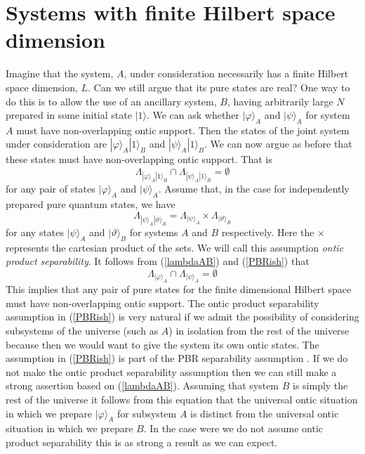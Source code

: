 \documentclass[12pt]{article}
\begin{document}
\section{Systems with finite Hilbert space dimension}\label{finitedimcase}


Imagine that the system, $A$, under consideration necessarily has a finite Hilbert space dimension, $L$.  Can we still argue that its pure states are real?  One way to do this is to allow
the use of an ancillary system, $B$, having arbitrarily large $N$ prepared in some initial state $|1\rangle$.  We can ask whether $|\varphi\rangle_A$ and $|\psi\rangle_A$ for system $A$ must
have non-overlapping ontic support.  Then the states of the joint system under consideration are $|\varphi\rangle_A |1\rangle_B$ and $|\psi\rangle_A|1\rangle_B$.  We can now argue as before
that these states must have non-overlapping ontic support.  That is 
\begin{equation}\label{lambdaAB} \Lambda_{|\varphi\rangle_A |1\rangle_B} \cap \Lambda_{|\psi\rangle_A|1\rangle_B} =
\emptyset \end{equation} 
for any pair of states $|\varphi\rangle_A$ and $|\psi\rangle_A$.  Assume that, in the case for independently prepared pure quantum states, we have
\begin{equation}\label{PBRish} \Lambda_{|\psi\rangle_A|\vartheta\rangle_B} = \Lambda_{|\psi\rangle_A}\times\Lambda_{|\vartheta\rangle_B} \end{equation} 
for any states $|\psi\rangle_A$ and
$|\vartheta\rangle_B$ for systems $A$ and $B$ respectively. Here the $\times$ represents the cartesian product of the sets. We will call this assumption \emph{ontic product separability}.
It follows from (\ref{lambdaAB}) and (\ref{PBRish}) that 
\begin{equation} \Lambda_{|\varphi\rangle_A} \cap \Lambda_{|\psi\rangle_A} = \emptyset \end{equation} 
This implies that any pair of
pure states for the finite dimensional Hilbert space must have non-overlapping ontic support.  The ontic product separability assumption in (\ref{PBRish}) is very natural if we admit the
possibility of considering subsystems of the universe (such as $A$) in isolation from the rest of the universe because then we would want to give the system its own ontic states.   The assumption in (\ref{PBRish}) is part of the PBR separability assumption
\cite{pusey2011quantum}.  If we do not make the ontic product separability assumption then we can still make a strong assertion based on (\ref{lambdaAB}).  Assuming that system $B$ is simply
the rest of the universe it  follows from this equation that the universal ontic situation in which we prepare $|\varphi\rangle_A$ for subsystem $A$ is distinct from the universal ontic
situation in which we prepare $B$.  In the case were we do not assume ontic product separability this is as strong a result as we can expect.
\end{document}
